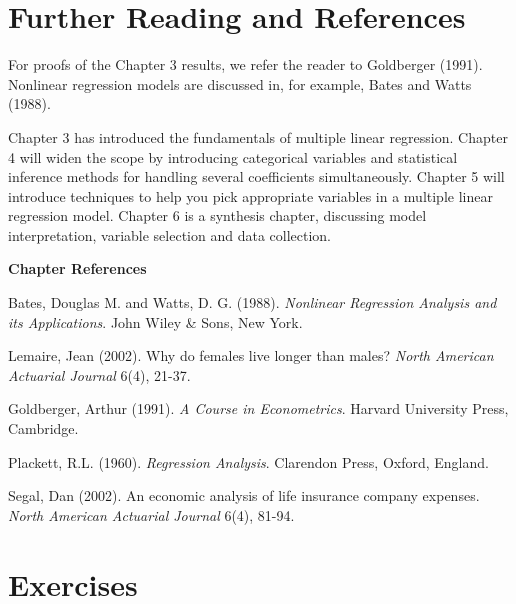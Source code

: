 \section{Further Reading and References}

For proofs of the Chapter 3 results, we refer the reader to
Goldberger (1991). Nonlinear regression models are discussed in, for
example, Bates and Watts (1988).

Chapter 3 has introduced the fundamentals of multiple linear
regression. Chapter 4 will widen the scope by introducing
categorical variables and statistical inference methods for handling
several coefficients simultaneously. Chapter 5 will introduce
techniques to help you pick appropriate variables in a multiple
linear regression model. Chapter 6 is a synthesis chapter,
discussing model interpretation, variable selection and data
collection.

\bigskip


\textbf{Chapter References}

\begin{multicols}{2}


Bates, Douglas M. and Watts, D. G. (1988). \textit{Nonlinear
Regression Analysis and its Applications}. John Wiley \& Sons, New
York.

Lemaire, Jean (2002). Why do females live longer than males?
\textit{North American Actuarial Journal} 6(4), 21-37.

Goldberger, Arthur (1991). \textit{A Course in Econometrics}.
Harvard University Press, Cambridge.

Plackett, R.L. (1960). \textit{Regression Analysis}. Clarendon
Press, Oxford, England.

Segal, Dan (2002). An economic analysis of life insurance company
expenses. \textit{North American Actuarial Journal} 6(4), 81-94.


\end{multicols}

\bigskip


\section{Exercises}

